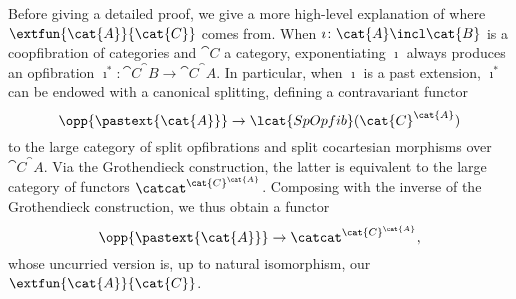     \begin{remark}
    Before giving a detailed proof, we give a more high-level explanation of where $\extfun{\cat{A}}{\cat{C}}$ comes from.
    When $\imath\colon \cat{A} \incl \cat{B}$ is a coopfibration of categories and $\cat{C}$ a category, exponentiating $\imath$ always produces an opfibration $\imath^*\colon \cat{C}^\cat{B} \to \cat{C}^\cat{A}$. 
    In particular, when $\imath$ is a past extension, $\imath^*$ can be endowed with a canonical splitting, defining a contravariant functor
    \begin{equation*}
        \opp{\pastext{\cat{A}}} \to \lcat{SpOpfib}(\cat{C}^\cat{A})
    \end{equation*}
    to the large category of split opfibrations and split cocartesian morphisms over $\cat{C}^\cat{A}$.
    Via the Grothendieck construction, the latter is equivalent to the large category of functors $\catcat^{\cat{C}^\cat{A}}$.
    Composing with the inverse of the Grothendieck construction, we thus obtain a functor
    \begin{equation*}
        \opp{\pastext{\cat{A}}} \to \catcat^{\cat{C}^\cat{A}},
    \end{equation*}
    whose uncurried version is, up to natural isomorphism, our $\extfun{\cat{A}}{\cat{C}}$.
    \end{remark}
